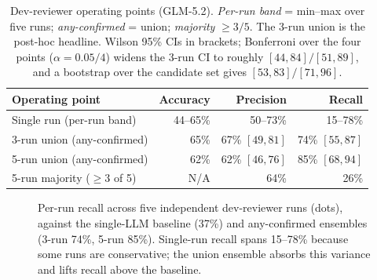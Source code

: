 \documentclass[sigconf]{acmart}
\begin{document}
\begin{table}[t]
\caption{Dev-reviewer operating points (GLM-5.2). \emph{Per-run band} = min--max over five runs; \emph{any-confirmed} = union; \emph{majority} $\ge 3/5$. The 3-run union is the post-hoc headline. Wilson 95\% CIs in brackets; Bonferroni over the four points ($\alpha{=}0.05/4$) widens the 3-run CI to roughly $[44,84]/[51,89]$, and a bootstrap over the candidate set gives $[53,83]/[71,96]$.}
\label{tab:opr}
\small
\begin{tabular}{@{}lrrr@{}}
\toprule
Operating point & Accuracy & Precision & Recall \\
\midrule
Single run (per-run band) & 44--65\% & 50--73\% & 15--78\% \\
3-run union (any-confirmed) & 65\% & 67\% $[49, 81]$ & 74\% $[55, 87]$ \\
5-run union (any-confirmed) & 62\% & 62\% $[46, 76]$ & 85\% $[68, 94]$ \\
5-run majority ($\ge 3$ of 5) & N/A & 64\% & 26\% \\
\bottomrule
\end{tabular}
\end{table}

\begin{figure}[t]
\centering
{}
\caption{Per-run recall across five independent dev-reviewer runs (dots), against the single-LLM baseline (37\%) and any-confirmed ensembles (3-run 74\%, 5-run 85\%). Single-run recall spans 15--78\% because some runs are conservative; the union ensemble absorbs this variance and lifts recall above the baseline.}
\label{fig:perrun}
\end{figure}
\end{document}
